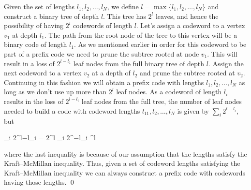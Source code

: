 Given the set of lengths $l_1, l_2, \ldots, l_N$, we define $l = \max\{ l_1, l_2, \ldots ,l_N \}$ and construct a binary tree of depth $l$. This tree has $2^l$ leaves, and hence the possibility of having $2^l$ codewords of length $l$. Let’s assign a codeword to a vertex $v_1$ at depth $l_1$. The path from the root node of the tree to this vertex will be a binary code of length $l_1$. As we mentioned earlier in order for this codeword to be part of a prefix code we need to prune the subtree rooted at node $v_1$. This will result in a loss of $2^{l−l_1}$ leaf nodes from the full binary tree of depth $l$. Assign the next codeword to a vertex $v_2$ at a depth of $l_2$ and prune the subtree rooted at $v_2$. Continuing in this fashion we will obtain a prefix code with lengths $l_1, l_2, \ldots, l_N$ as long as we don’t use up more than $2^l$ leaf nodes. As a codeword of length $l_i$ results in the loss of $2^{l−l_i}$ leaf nodes from the full tree, the number of leaf nodes needed to build a code with codeword lengths $l_11, l_2, \ldots, l_N$ is given by $\sum_i 2^{l−l_i}$, but

\bee
\sum_i 2^{l−l_i} = 2^l \sum_i 2^{−l_i} ^l
\eee

where the last inequality is because of our assumption that the lengths satisfy the Kraft–McMillan inequality. Thus, given a set of codeword lengths satisfying the Kraft–McMillan inequality we can always construct a prefix code with codewords having those lengths. \qed

